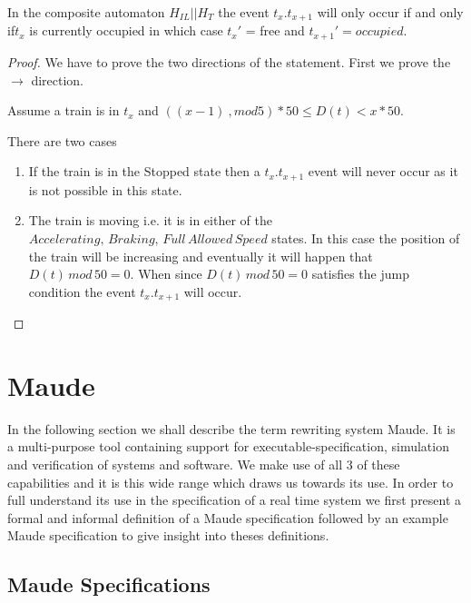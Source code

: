 \begin{mytheorem}

In the composite automaton $H_{IL}|| H_{T} $  the event $t_x.t_{x+1}$ will only occur if  and only if$t_x$ is currently occupied in which case $t_x'$ = free and $t_{x+1}' = occupied$.


\begin{proof}
We have to prove the two directions of the statement. First we prove the $\to$ direction.




Assume a train is in $t_x$ and $((x-1) \ ,mod 5) * 50 \leq D(t) < x *50$.

There are two cases
\begin{enumerate}
\item If the train is in the Stopped state then a $t_{x}.t_{x+1}$ event will never occur as it is not possible in this state.

\item The train is moving i.e. it is in either of the $Accelerating, \, Braking , \,  Full \, Allowed \, Speed$ states. In this case the position of the train will be increasing and eventually it will happen that $D(t) \,  mod \, 50 = 0$. When since $D(t) \, mod \, 50 = 0$  satisfies the jump condition the event
 $t_{x}.t_{x+ 1}$ will occur.  
 

\end{enumerate}
\end{proof}
\end{mytheorem}


\section{Maude}
In the following section we shall describe the term rewriting system Maude. It is a multi-purpose tool containing support for executable-specification, simulation and verification of systems and software. We make use of all 3 of these capabilities and it is this wide range which draws us towards its use. In order to full understand its use in the specification of a real time system we first present a formal and informal definition of a Maude specification followed by an example Maude specification to give insight into theses definitions.



\subsection{Maude Specifications}


